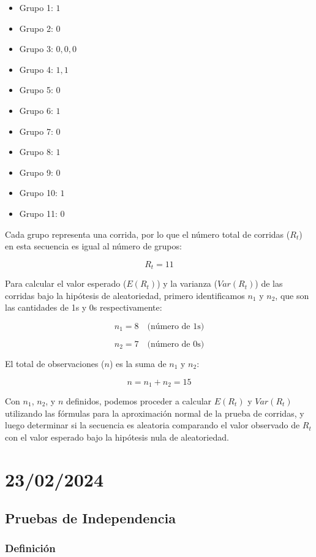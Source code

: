 \documentclass{article}
\begin{document}
\begin{itemize}
    \item Grupo 1: $1$
    \item Grupo 2: $0$
    \item Grupo 3: $0, 0, 0$
    \item Grupo 4: $1, 1$
    \item Grupo 5: $0$
    \item Grupo 6: $1$
    \item Grupo 7: $0$
    \item Grupo 8: $1$
    \item Grupo 9: $0$
    \item Grupo 10: $1$
    \item Grupo 11: $0$
\end{itemize}

Cada grupo representa una corrida, por lo que el número total de corridas (\(R_t\)) en esta secuencia es igual al número de grupos:

\[R_t = 11\]

Para calcular el valor esperado (\(E(R_t)\)) y la varianza (\(Var(R_t)\)) de las corridas bajo la hipótesis de aleatoriedad, primero identificamos \(n_1\) y \(n_2\), que son las cantidades de 1s y 0s respectivamente:

\[n_1 = 8 \quad \text{(número de 1s)}\]

\[n_2 = 7 \quad \text{(número de 0s)}\]

El total de observaciones (\(n\)) es la suma de \(n_1\) y \(n_2\):

\[n = n_1 + n_2 = 15\]

Con \(n_1\), \(n_2\), y \(n\) definidos, podemos proceder a calcular \(E(R_t)\) y \(Var(R_t)\) utilizando las fórmulas para la aproximación normal de la prueba de corridas, y luego determinar si la secuencia es aleatoria comparando el valor observado de \(R_t\) con el valor esperado bajo la hipótesis nula de aleatoriedad.

\newpage

\section{23/02/2024}

\subsection{Pruebas de Independencia}

\subsubsection*{Definición}
\end{document}
